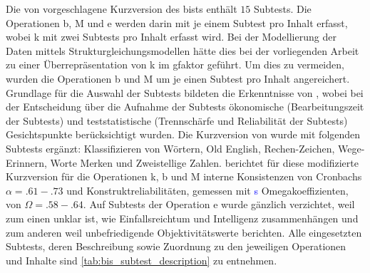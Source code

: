 \documentclass[11pt, twoside, a4paper]{book}		%
\begin{document}
Die von \citet{Jaeger1997} vorgeschlagene Kurzversion des \gls{bist}s enthält $15$ Subtests. Die Operationen \gls{b}, \gls{M} und \gls{e} werden darin mit je einem Subtest pro Inhalt erfasst, wobei \gls{k} mit zwei Subtests pro Inhalt erfasst wird. Bei der Modellierung der Daten mittels Strukturgleichungsmodellen hätte dies bei der vorliegenden Arbeit zu einer Überrepräsentation von \gls{k} im \gls{gfaktor} geführt. Um dies zu vermeiden, wurden die Operationen \gls{b} und \gls{M} um je einen Subtest pro Inhalt angereichert. Grundlage für die Auswahl der Subtests bildeten die Erkenntnisse von \citet{Wicki2014}, wobei bei der Entscheidung über die Aufnahme der Subtests ökonomische (Bearbeitungszeit der Subtests) und teststatistische (Trennschärfe und Reliabilität der Subtests)  Gesichtspunkte berücksichtigt wurden. Die Kurzversion von \citet{Jaeger1997} wurde mit folgenden Subtests ergänzt: Klassifizieren von Wörtern, Old English, Rechen-Zeichen, Wege-Erinnern, Worte Merken und Zweistellige Zahlen. 
\citet{Wicki2014} berichtet für diese modifizierte Kurzversion für die Operationen \gls{k}, \gls{b} und \gls{M} interne Konsistenzen von Cronbachs $\alpha=.61-.73$ und Konstruktreliabilitäten, gemessen mit \citeauthor{McDonald1999}\textcolor{blue}{s} \citeyearpar{McDonald1999} Omegakoeffizienten, von $\Omega = .58-.64$.
Auf Subtests der Operation \gls{e} wurde gänzlich verzichtet, weil zum einen unklar ist, wie Einfallsreichtum und Intelligenz zusammenhängen \citep{Kim2005} und zum anderen weil \citet{Jaeger1997} unbefriedigende Objektivitätswerte berichten. 
Alle eingesetzten Subtests, deren Beschreibung sowie Zuordnung zu den jeweiligen Operationen und Inhalte sind \autoref{tab:bis_subtest_description} zu entnehmen.
\end{document}
